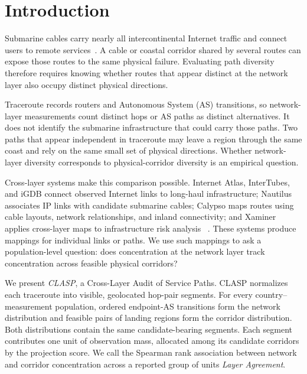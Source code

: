 \section{Introduction}
\label{sec:introduction}

Submarine cables carry nearly all intercontinental Internet traffic and connect
users to remote services~\cite{telegeography_submarine_map}. A cable or coastal
corridor shared by several routes can expose those routes to the same physical
failure. Evaluating path diversity therefore requires knowing whether routes
that appear distinct at the network layer also occupy distinct physical
directions.

Traceroute records routers and Autonomous System (AS) transitions, so network-
layer measurements count distinct hops or AS paths as distinct alternatives.
It does not identify the submarine infrastructure that could carry those
paths. Two paths that appear independent in traceroute may leave a region
through the same coast and rely on the same small set of physical directions.
Whether network-layer diversity corresponds to physical-corridor diversity is
an empirical question.

Cross-layer systems make this comparison possible. Internet Atlas, InterTubes,
and iGDB connect observed Internet links to long-haul infrastructure;
Nautilus associates IP links with candidate submarine cables; Calypso maps
routes using cable layouts, network relationships, and inland connectivity;
and Xaminer applies cross-layer maps to infrastructure risk analysis
~\cite{durairajan2013atlas,durairajan2015intertubes,anderson2022igdb,
ramanathan2023nautilus,wang2025calypso,ramanathan2024xaminer}. These systems
produce mappings for individual links or paths. We use such mappings to ask a
population-level question: does concentration at the network layer track
concentration across feasible physical corridors?

We present \emph{CLASP}, a Cross-Layer Audit of Service Paths. CLASP normalizes
each traceroute into visible, geolocated hop-pair segments. For every country--
measurement population, ordered endpoint-AS transitions form the network
distribution and feasible pairs of landing regions form the corridor
distribution. Both distributions contain the same candidate-bearing segments.
Each segment contributes one unit of observation mass, allocated among its
candidate corridors by the projection score. We call the Spearman rank
association between network and corridor concentration across a reported group
of units \emph{Layer Agreement}.

